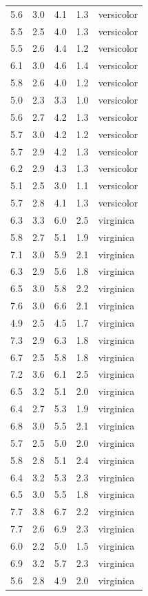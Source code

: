 \documentclass[
  letterpaper,
  DIV=11,
  numbers=noendperiod,
  oneside]{scrreprt}
\begin{document}
\begin{longtable}[]{@{}rrrrl@{}}
5.6 & 3.0 & 4.1 & 1.3 & versicolor \\
5.5 & 2.5 & 4.0 & 1.3 & versicolor \\
5.5 & 2.6 & 4.4 & 1.2 & versicolor \\
6.1 & 3.0 & 4.6 & 1.4 & versicolor \\
5.8 & 2.6 & 4.0 & 1.2 & versicolor \\
5.0 & 2.3 & 3.3 & 1.0 & versicolor \\
5.6 & 2.7 & 4.2 & 1.3 & versicolor \\
5.7 & 3.0 & 4.2 & 1.2 & versicolor \\
5.7 & 2.9 & 4.2 & 1.3 & versicolor \\
6.2 & 2.9 & 4.3 & 1.3 & versicolor \\
5.1 & 2.5 & 3.0 & 1.1 & versicolor \\
5.7 & 2.8 & 4.1 & 1.3 & versicolor \\
6.3 & 3.3 & 6.0 & 2.5 & virginica \\
5.8 & 2.7 & 5.1 & 1.9 & virginica \\
7.1 & 3.0 & 5.9 & 2.1 & virginica \\
6.3 & 2.9 & 5.6 & 1.8 & virginica \\
6.5 & 3.0 & 5.8 & 2.2 & virginica \\
7.6 & 3.0 & 6.6 & 2.1 & virginica \\
4.9 & 2.5 & 4.5 & 1.7 & virginica \\
7.3 & 2.9 & 6.3 & 1.8 & virginica \\
6.7 & 2.5 & 5.8 & 1.8 & virginica \\
7.2 & 3.6 & 6.1 & 2.5 & virginica \\
6.5 & 3.2 & 5.1 & 2.0 & virginica \\
6.4 & 2.7 & 5.3 & 1.9 & virginica \\
6.8 & 3.0 & 5.5 & 2.1 & virginica \\
5.7 & 2.5 & 5.0 & 2.0 & virginica \\
5.8 & 2.8 & 5.1 & 2.4 & virginica \\
6.4 & 3.2 & 5.3 & 2.3 & virginica \\
6.5 & 3.0 & 5.5 & 1.8 & virginica \\
7.7 & 3.8 & 6.7 & 2.2 & virginica \\
7.7 & 2.6 & 6.9 & 2.3 & virginica \\
6.0 & 2.2 & 5.0 & 1.5 & virginica \\
6.9 & 3.2 & 5.7 & 2.3 & virginica \\
5.6 & 2.8 & 4.9 & 2.0 & virginica \\

\end{longtable}
\end{document}
